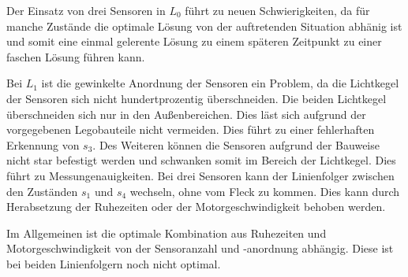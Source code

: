 Der Einsatz von drei Sensoren in $L_0$ führt zu neuen Schwierigkeiten, da für manche Zustände die optimale Lösung von der auftretenden Situation abhänig ist und somit eine einmal gelerente Lösung zu einem späteren Zeitpunkt zu einer faschen Lösung führen kann.\par
Bei $L_1$ ist die gewinkelte Anordnung der Sensoren ein Problem, da die Lichtkegel der Sensoren sich nicht hundertprozentig überschneiden. Die beiden Lichtkegel überschneiden sich nur in den Außenbereichen. Dies läst sich aufgrund der vor\-ge\-ge\-benen Legobauteile nicht vermeiden. Dies führt zu einer fehlerhaften Erkennung von $s_3$. Des Weiteren können die Sensoren aufgrund der Bauweise nicht star befestigt werden und schwanken somit im Bereich der Lichtkegel. Dies führt zu Messungenauigkeiten. Bei drei Sensoren kann der Linienfolger zwischen den Zuständen $s_1$ und $s_4$ wechseln, ohne vom Fleck zu kommen. Dies kann durch Herabsetzung der Ruhezeiten oder der Motorgeschwindigkeit behoben werden.\par
Im Allgemeinen ist die optimale Kombination aus Ruhezeiten und Motorgeschwindigkeit von der Sensoranzahl und -anordnung abhängig. Diese ist bei beiden Linienfolgern noch nicht optimal. 

